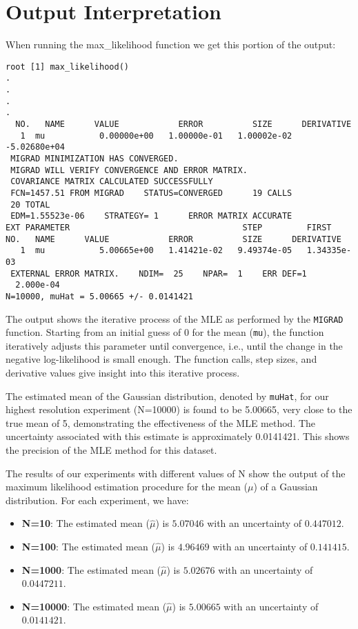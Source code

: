 \documentclass[12pt]{article}
\begin{document}
\section*{Output Interpretation}

When running the max\_likelihood function we get this portion of the output:

\begin{verbatim}
root [1] max_likelihood()
.
.
.
.
  NO.   NAME      VALUE            ERROR          SIZE      DERIVATIVE 
   1  mu           0.00000e+00   1.00000e-01   1.00002e-02  -5.02680e+04
 MIGRAD MINIMIZATION HAS CONVERGED.
 MIGRAD WILL VERIFY CONVERGENCE AND ERROR MATRIX.
 COVARIANCE MATRIX CALCULATED SUCCESSFULLY
 FCN=1457.51 FROM MIGRAD    STATUS=CONVERGED      19 CALLS
 20 TOTAL
 EDM=1.55523e-06    STRATEGY= 1      ERROR MATRIX ACCURATE 
EXT PARAMETER                                   STEP         FIRST   
NO.   NAME      VALUE            ERROR          SIZE      DERIVATIVE 
   1  mu           5.00665e+00   1.41421e-02   9.49374e-05   1.34335e-03
 EXTERNAL ERROR MATRIX.    NDIM=  25    NPAR=  1    ERR DEF=1
  2.000e-04 
N=10000, muHat = 5.00665 +/- 0.0141421
\end{verbatim}

The output shows the iterative process of the MLE as performed by the \texttt{MIGRAD} function. Starting from an initial guess of 0 for the mean (\texttt{mu}), the function iteratively adjusts this parameter until convergence, i.e., until the change in the negative log-likelihood is small enough. The function calls, step sizes, and derivative values give insight into this iterative process.

The estimated mean of the Gaussian distribution, denoted by \texttt{muHat}, for our highest resolution experiment (N=10000) is found to be 5.00665, very close to the true mean of 5, demonstrating the effectiveness of the MLE method. The uncertainty associated with this estimate is approximately 0.0141421. This shows the precision of the MLE method for this dataset.

The results of our experiments with different values of N show the output of the maximum likelihood estimation procedure for the mean ($\mu$) of a Gaussian distribution. For each experiment, we have:

\begin{itemize}
  \item \textbf{N=10}: The estimated mean ($\hat{\mu}$) is $5.07046$ with an uncertainty of $0.447012$.
  \item \textbf{N=100}: The estimated mean ($\hat{\mu}$) is $4.96469$ with an uncertainty of $0.141415$.
  \item \textbf{N=1000}: The estimated mean ($\hat{\mu}$) is $5.02676$ with an uncertainty of $0.0447211$.
  \item \textbf{N=10000}: The estimated mean ($\hat{\mu}$) is $5.00665$ with an uncertainty of $0.0141421$.
\end{itemize}
\end{document}
